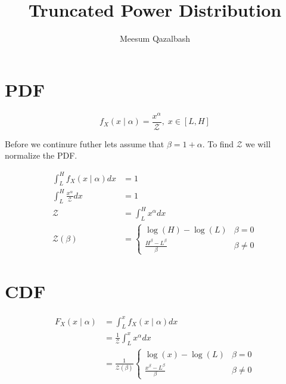 \documentclass{article}
\title{Truncated Power Distribution}
\author{Meesum Qazalbash}
\newcommand{\Z}{\mathcal{Z}}
\newcommand{\Log}[1]{\log{\left(#1\right)}}
\begin{document}
\maketitle

\section{PDF}

\begin{equation}
    f_{X}(x\mid\alpha) = \frac{x^{\alpha}}{\Z},\; x \in [L,H]
\end{equation}

Before we continure futher lets assume that \(\beta=1+\alpha\). To find $\Z$ we will normalize the PDF.

\begin{align}
    \int_{L}^{H} f_{X}(x\mid\alpha) dx    & = 1                                                                                                        \\
    \int_{L}^{H} \frac{x^{\alpha}}{\Z} dx & = 1                                                                                                        \\
    \Z                                    & = \int_{L}^{H} x^{\alpha} dx                                                                               \\
    \Z(\beta)                             & = \begin{cases}
                                                  \Log{H} - \Log{L}                                 & \beta = 0    \\
                                                  \displaystyle \frac{H^{\beta} - L^{\beta}}{\beta} & \beta \neq 0
                                              \end{cases}
\end{align}


\section{CDF}

\begin{align}
    F_{X}(x\mid\alpha) & = \int_{L}^{x} f_{X}(x\mid\alpha) dx                                                                                           \\
                       & = \frac{1}{\Z} \int_{L}^{x} x^{\alpha} dx                                                                                      \\
                       & = \frac{1}{\Z(\beta)} \begin{cases}
                                                   \Log{x} - \Log{L}                                 & \beta = 0    \\
                                                   \displaystyle \frac{x^{\beta} - L^{\beta}}{\beta} & \beta \neq 0
                                               \end{cases}
\end{align}
\end{document}
